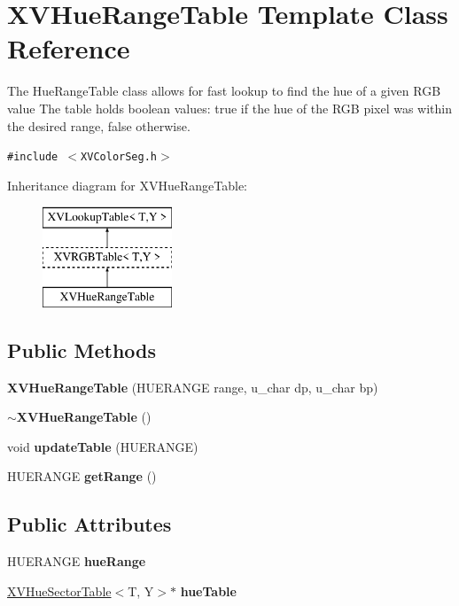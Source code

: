 \hypertarget{class_XVHueRangeTable}{
\section{XVHue\-Range\-Table  Template Class Reference}
\label{XVHueRangeTable}
}
The Hue\-Range\-Table class allows for fast lookup to find the hue of a given RGB value The table holds boolean values: true if the hue of the RGB pixel was within the desired range, false otherwise. 


{\tt \#include $<$XVColor\-Seg.h$>$}

Inheritance diagram for XVHue\-Range\-Table:\begin{figure}[H]
\begin{center}
\leavevmode
\includegraphics[height=3cm]{class_XVHueRangeTable}
\end{center}
\end{figure}
\subsection*{Public Methods}
\begin{CompactItemize}
\item 
{\bf XVHue\-Range\-Table} (HUERANGE range, u\_\-char dp, u\_\-char bp)
\item 
{\bf $\sim$XVHue\-Range\-Table} ()
\item 
\label{XVHueRangeTable_a2}
\hypertarget{class_XVHueRangeTable_a2}{
void {\bf update\-Table} (HUERANGE)}

\item 
HUERANGE {\bf get\-Range} ()
\end{CompactItemize}
\subsection*{Public Attributes}
\begin{CompactItemize}
\item 
HUERANGE {\bf hue\-Range}
\item 
\hyperlink{class_XVHueSectorTable}{XVHue\-Sector\-Table}$<$T, Y$>$$\ast$ {\bf hue\-Table}
\end{CompactItemize}
